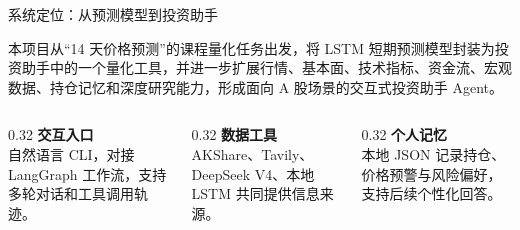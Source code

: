 \documentclass[10pt,aspectratio=43]{beamer}
\begin{document}
\begin{frame}{系统定位：从预测模型到投资助手}
  \vspace{0.4em}
  \begin{greenbox}[title=当前定位]
    \footnotesize
    本项目从“14 天价格预测”的课程量化任务出发，将 LSTM 短期预测模型封装为投资助手中的一个量化工具，并进一步扩展行情、基本面、技术指标、资金流、宏观数据、持仓记忆和深度研究能力，形成面向 A 股场景的交互式投资助手 Agent。
  \end{greenbox}
  \vspace{0.7em}
  \begin{columns}[T]
    \begin{column}{0.32\textwidth}
      \textbf{\color{ZJUBlue}交互入口}\\[0.3em]
      \footnotesize 自然语言 CLI，对接 LangGraph 工作流，支持多轮对话和工具调用轨迹。
    \end{column}
    \begin{column}{0.32\textwidth}
      \textbf{\color{ZJUBlue}数据工具}\\[0.3em]
      \footnotesize AKShare、Tavily、DeepSeek V4、本地 LSTM 共同提供信息来源。
    \end{column}
    \begin{column}{0.32\textwidth}
      \textbf{\color{ZJUBlue}个人记忆}\\[0.3em]
      \footnotesize 本地 JSON 记录持仓、价格预警与风险偏好，支持后续个性化回答。
    \end{column}
  \end{columns}
\end{frame}
\end{document}
